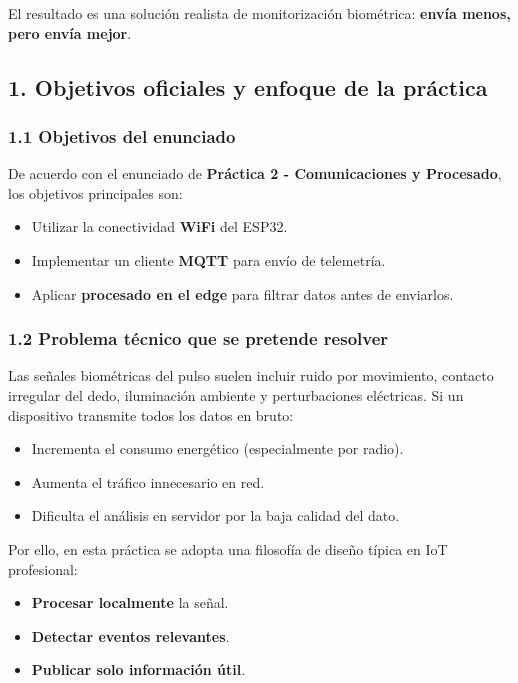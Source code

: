\documentclass[11pt]{article}
\providecommand{\tightlist}{%
      \setlength{\itemsep}{0pt}\setlength{\parskip}{0pt}}
\begin{document}
El resultado es una solución realista de monitorización biométrica:
\textbf{envía menos, pero envía mejor}.

    \subsection{1. Objetivos oficiales y enfoque de la
práctica}\label{objetivos-oficiales-y-enfoque-de-la-pruxe1ctica}

\subsubsection{1.1 Objetivos del
enunciado}\label{objetivos-del-enunciado}

De acuerdo con el enunciado de \textbf{Práctica 2 - Comunicaciones y
Procesado}, los objetivos principales son:

\begin{itemize}
\tightlist
\item
  Utilizar la conectividad \textbf{WiFi} del ESP32.
\item
  Implementar un cliente \textbf{MQTT} para envío de telemetría.
\item
  Aplicar \textbf{procesado en el edge} para filtrar datos antes de
  enviarlos.
\end{itemize}

\subsubsection{1.2 Problema técnico que se pretende
resolver}\label{problema-tuxe9cnico-que-se-pretende-resolver}

Las señales biométricas del pulso suelen incluir ruido por movimiento,
contacto irregular del dedo, iluminación ambiente y perturbaciones
eléctricas. Si un dispositivo transmite todos los datos en bruto:

\begin{itemize}
\tightlist
\item
  Incrementa el consumo energético (especialmente por radio).
\item
  Aumenta el tráfico innecesario en red.
\item
  Dificulta el análisis en servidor por la baja calidad del dato.
\end{itemize}

Por ello, en esta práctica se adopta una filosofía de diseño típica en
IoT profesional:

\begin{itemize}
\tightlist
\item
  \textbf{Procesar localmente} la señal.
\item
  \textbf{Detectar eventos relevantes}.
\item
  \textbf{Publicar solo información útil}.
\end{itemize}
\end{document}
